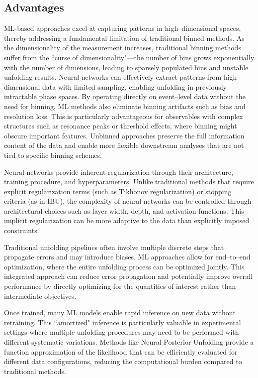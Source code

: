 \subsection{Advantages}
    ML-based approaches excel at capturing patterns in high--dimensional spaces, thereby addressing a fundamental limitation of traditional binned methods.
    As the dimensionality of the measurement increases, traditional binning methods suffer from the ``curse of dimensionality"---the number of bins grows exponentially with the number of dimensions, leading to sparsely populated bins and unstable unfolding results.
    Neural networks can effectively extract patterns from high--dimensional data with limited sampling, enabling unfolding in previously intractable phase spaces.
    By operating directly on event--level data without the need for binning, ML methods also eliminate binning artifacts such as bias and resolution loss.
    This is particularly advantageous for observables with complex structures such as resonance peaks or threshold effects, where binning might obscure important features.
    Unbinned approaches preserve the full information content of the data and enable more flexible downstream analyses that are not tied to specific binning schemes.

    Neural networks provide inherent regularization through their architecture, training procedure, and hyperparameters.
    Unlike traditional methods that require explicit regularization terms (such as Tikhonov regularization) or stopping criteria (as in IBU), the complexity of neural networks can be controlled through architectural choices such as layer width, depth, and activation functions.
    This implicit regularization can be more adaptive to the data than explicitly imposed constraints.

    Traditional unfolding pipelines often involve multiple discrete steps that propagate errors and may introduce biases.
    ML approaches allow for end--to--end optimization, where the entire unfolding process can be optimized jointly.
    This integrated approach can reduce error propagation and potentially improve overall performance by directly optimizing for the quantities of interest rather than intermediate objectives.
    
    Once trained, many ML models enable rapid inference on new data without retraining.
    This ``amortized" inference is particularly valuable in experimental settings where multiple unfolding procedures may need to be performed with different systematic variations.
    Methods like Neural Posterior Unfolding provide a function approximation of the likelihood that can be efficiently evaluated for different data configurations, reducing the computational burden compared to traditional methods.
